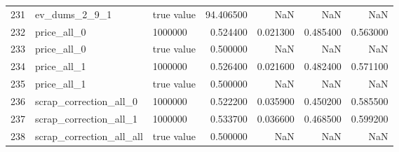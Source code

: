 \begin{tabular}{lllrrrr}
231 & ev_dums_2_9_1 & true value & 94.406500 & NaN & NaN & NaN \\
232 & price_all_0 & 1000000 & 0.524400 & 0.021300 & 0.485400 & 0.563000 \\
233 & price_all_0 & true value & 0.500000 & NaN & NaN & NaN \\
234 & price_all_1 & 1000000 & 0.526400 & 0.021600 & 0.482400 & 0.571100 \\
235 & price_all_1 & true value & 0.500000 & NaN & NaN & NaN \\
236 & scrap_correction_all_0 & 1000000 & 0.522200 & 0.035900 & 0.450200 & 0.585500 \\
237 & scrap_correction_all_1 & 1000000 & 0.533700 & 0.036600 & 0.468500 & 0.599200 \\
238 & scrap_correction_all_all & true value & 0.500000 & NaN & NaN & NaN \\
\bottomrule
\end{tabular}
